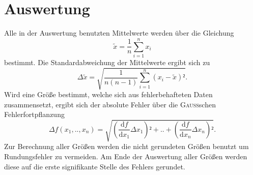 \section{Auswertung}
\label{sec:Auswertung}
Alle in der Auswertung benutzten Mittelwerte werden über die Gleichung
\begin{equation}
\tilde{x}=\frac{1}{n}\sum_{i=1}^n {x_i}
\end{equation}
bestimmt. Die Standardabweichung der Mittelwerte ergibt sich zu 
\begin{equation}
\Delta{\tilde{x}}=\sqrt{\frac{1}{n(n-1)}\sum_{i=1}^n {(x_i-\tilde{x})²}}.
\end{equation}
Wird eine Größe bestimmt, welche sich aus fehlerbehafteten Daten zusammensetzt, ergibt sich der absolute Fehler über die \textsc{Gauss}schen Fehlerfortpflanzung 
\begin{equation}
\Delta{f}(x_1,..,x_n)=\sqrt{\left(\frac{\mathup{d}f}{\mathup{d}x_1}\Delta{x_1}\right)²+..+\left(\frac{\mathup{d}f}{\mathup{d}x_n}\Delta{x_n}\right)²}.
\end{equation}
Zur Berechnung aller Größen werden die nicht gerundeten Größen benutzt um Rundungsfehler zu vermeiden. Am Ende der Auswertung aller Größen werden diese auf die erste signifikante Stelle des Fehlers gerundet. 

